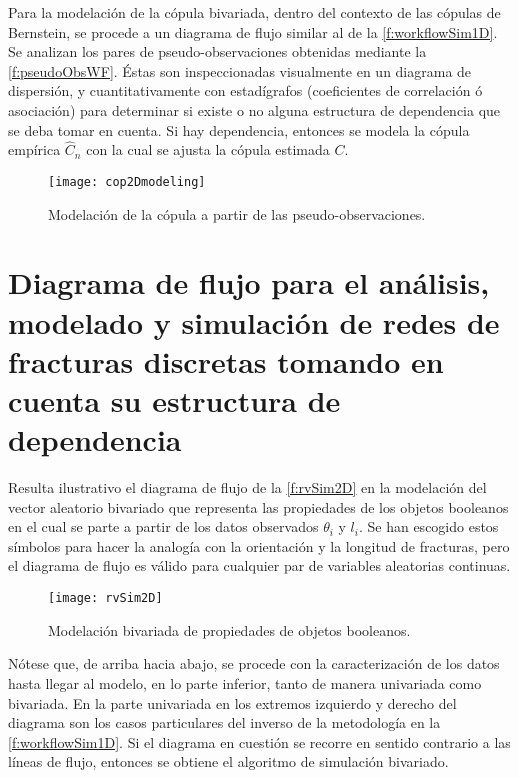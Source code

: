 Para la modelaci\'on de la c\'opula bivariada, dentro del contexto de las c\'opulas de Bernstein, se procede a un diagrama de flujo similar al de la \autoref{f:workflowSim1D}. Se analizan los pares de pseudo-observaciones obtenidas mediante la \autoref{f:pseudoObsWF}. \'Estas son inspeccionadas visualmente en un diagrama de dispersi\'on, y cuantitativamente con estad\'igrafos (coeficientes de correlaci\'on \'o asociaci\'on) para determinar si existe o no alguna estructura de dependencia que se deba tomar en cuenta. Si hay dependencia, entonces se modela la c\'opula emp\'irica $\hat{C}_n$ con la cual se ajusta la c\'opula estimada $C$.

\begin{figure}
	\centering
	\texttt{[image: cop2Dmodeling]}
	\caption{Modelaci\'on de la c\'opula a partir de las pseudo-observaciones.}
	\label{f:cop2Dmodeling}
\end{figure}

\section{Diagrama de flujo para el an\'alisis, modelado y simulaci\'on de redes de fracturas discretas tomando en cuenta su estructura de dependencia}

Resulta ilustrativo el diagrama de flujo  de la \autoref{f:rvSim2D} en la modelaci\'on del vector aleatorio bivariado que representa las propiedades de los objetos booleanos en el cual se parte a partir de los datos observados $\theta_i$ y $l_i$. Se han escogido estos s\'imbolos para hacer la analog\'ia con la orientaci\'on y la longitud de fracturas, pero el diagrama de flujo es v\'alido para cualquier par de variables aleatorias continuas.

\begin{figure}[H]
	\centering
	\texttt{[image: rvSim2D]}
	\caption{Modelaci\'on bivariada de propiedades de objetos booleanos.}
	\label{f:rvSim2D}
\end{figure}

N\'otese que, de arriba hacia abajo, se procede con la caracterizaci\'on de los datos hasta llegar al modelo, en lo parte inferior, tanto de manera univariada como bivariada. En la parte univariada en los extremos izquierdo y derecho del diagrama son los casos particulares del inverso de la metodolog\'ia en la \autoref{f:workflowSim1D}. Si el diagrama en cuesti\'on se recorre en sentido contrario a las l\'ineas de flujo, entonces se obtiene el algoritmo de simulaci\'on bivariado.

